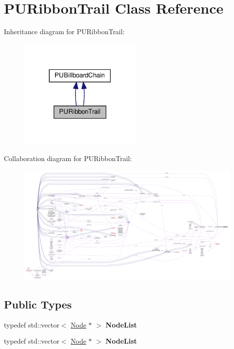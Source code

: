 \hypertarget{classPURibbonTrail}{}\section{P\+U\+Ribbon\+Trail Class Reference}
\label{classPURibbonTrail}


Inheritance diagram for P\+U\+Ribbon\+Trail\+:
\nopagebreak
\begin{figure}[H]
\begin{center}
\leavevmode
\includegraphics[width=174pt]{classPURibbonTrail__inherit__graph}
\end{center}
\end{figure}


Collaboration diagram for P\+U\+Ribbon\+Trail\+:
\nopagebreak
\begin{figure}[H]
\begin{center}
\leavevmode
\includegraphics[width=350pt]{classPURibbonTrail__coll__graph}
\end{center}
\end{figure}
\subsection*{Public Types}
\begin{DoxyCompactItemize}
\item 
\mbox{\label{classPURibbonTrail_ab4d5ca62e5ae77ee6c3aa1a7c79f61e4}} 
typedef std\+::vector$<$ \hyperlink{classNode}{Node} $\ast$ $>$ {\bfseries Node\+List}
\item 
\mbox{\label{classPURibbonTrail_ab4d5ca62e5ae77ee6c3aa1a7c79f61e4}} 
typedef std\+::vector$<$ \hyperlink{classNode}{Node} $\ast$ $>$ {\bfseries Node\+List}
\end{DoxyCompactItemize}
